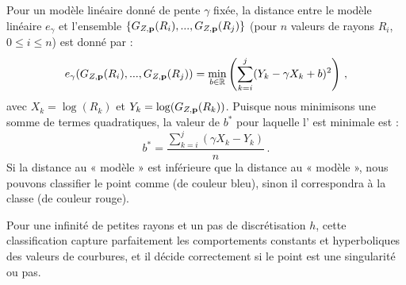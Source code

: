 Pour un modèle linéaire donné de pente $\gamma$ fixée, la distance entre le modèle
linéaire $e_\gamma$ et l'ensemble $\{G_{Z,\mathbf{p}}(R_i), ..., G_{Z,\mathbf{p}}(R_j)\}$ (pour
$n$ valeurs de rayons $R_i$, $0 \leq i \leq n$) est donné par :
%
\begin{equation}
  \label{eq:distance-modele-lineaire}
  e_\gamma(G_{Z,\mathbf{p}}(R_i), ..., G_{Z,\mathbf{p}}(R_j))= \min_{b\in \mathbb{R}}
  \left ( \sum_{k=i}^j (Y_k - \gamma X_k + b)^2\right)\,,
\end{equation}
%
avec $X_k=\log (R_k)$ et $Y_k=\log(G_{Z,\mathbf{p}}(R_k))$. Puisque nous minimisons une
somme de termes quadratiques, la valeur de $b^*$ pour laquelle
l' est minimale est :
%
\begin{equation}
  b^* = \frac{\sum_{k=i}^j ( \gamma X_k - Y_k)}{n}\,.
\end{equation}
%
Si la distance au « modèle \featsmooth » est inférieure que la distance au «
modèle \featedge », nous pouvons classifier le point comme \featsmooth (de
couleur bleu), sinon il correspondra à la classe \featedge (de couleur rouge).


Pour une infinité de petites rayons et un pas de discrétisation $h$, cette
classification capture parfaitement les comportements constants et hyperboliques
des valeurs de courbures, et il décide correctement si le point est une
singularité ou pas.
%
